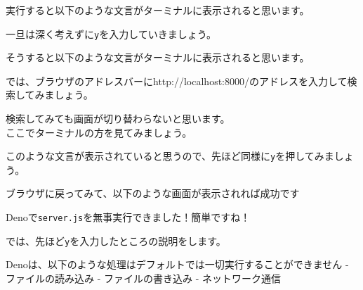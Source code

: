 実行すると以下のような文言がターミナルに表示されると思います。

\begin{Shaded}
\begin{Highlighting}[]
\end{Highlighting}
\end{Shaded}

一旦は深く考えずに\texttt{y}を入力していきましょう。

そうすると以下のような文言がターミナルに表示されると思います。

\begin{Shaded}
\begin{Highlighting}[]
\end{Highlighting}
\end{Shaded}

では、ブラウザのアドレスバーにhttp://localhost:8000/のアドレスを入力して検索してみましょう。

検索してみても画面が切り替わらないと思います。\\
ここでターミナルの方を見てみましょう。

\begin{Shaded}
\begin{Highlighting}[]
\end{Highlighting}
\end{Shaded}

このような文言が表示されていると思うので、先ほど同様に\texttt{y}を押してみましょう。

ブラウザに戻ってみて、以下のような画面が表示されれば成功です🙆‍♀️

Denoで\texttt{server.js}を無事実行できました！簡単ですね！

では、先ほど\texttt{y}を入力したところの説明をします。

Denoは、以下のような処理はデフォルトでは一切実行することができません -
ファイルの読み込み - ファイルの書き込み - ネットワーク通信

